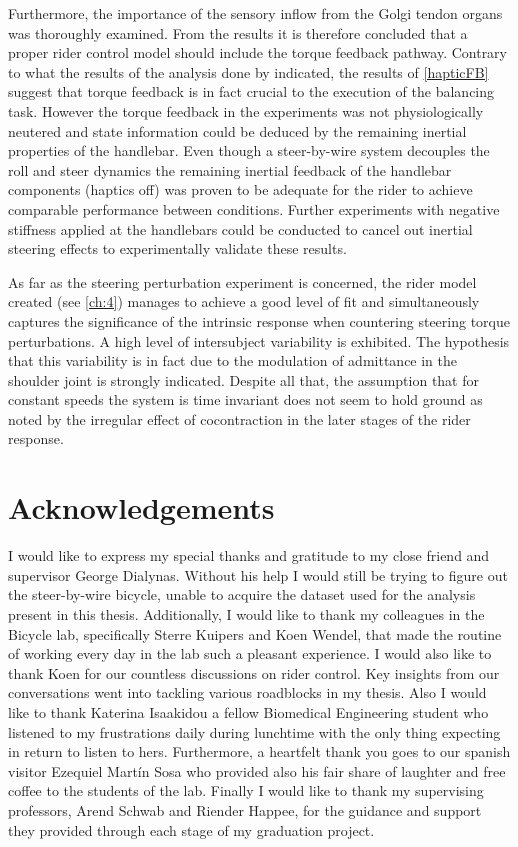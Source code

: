 Furthermore, the importance of the sensory inflow from the Golgi tendon organs was thoroughly examined. From the results it is therefore concluded that a proper rider control model should include the torque feedback pathway. Contrary to what  the results of the analysis done by \citet{dialynaseffect} indicated, the results of \cref{hapticFB} suggest that torque feedback is in fact crucial to the execution of the balancing task. However the torque feedback in the experiments was not physiologically neutered and  state information could be deduced by the remaining inertial properties of the handlebar. Even though a steer-by-wire system decouples the roll and steer dynamics the remaining inertial feedback of the handlebar components (haptics off) was proven to be adequate for the rider to achieve comparable performance between conditions. Further experiments with negative stiffness applied at the handlebars could be conducted to cancel out inertial steering effects to experimentally validate  these results.
 
 
As far as the steering perturbation experiment is concerned, the rider model created (see \cref{ch:4}) manages to achieve a good level of fit and simultaneously captures the significance of the intrinsic response when countering steering torque perturbations. A high level of intersubject variability is exhibited. The hypothesis that this variability is in fact due to the modulation of admittance in the shoulder joint is strongly indicated. Despite all that,  the assumption that for constant speeds the system is time invariant does not seem to hold ground as noted by the irregular effect of cocontraction in the later stages of the rider  response.


\chapter*{Acknowledgements}

I would like to express my special thanks and gratitude to my close friend and supervisor  George Dialynas. Without his help I would still be trying to figure out the steer-by-wire bicycle, unable to acquire the dataset used for the analysis present in this thesis. Additionally, I would like to thank my colleagues in the Bicycle lab, specifically Sterre Kuipers and Koen Wendel, that made the routine of working every day in the lab such a pleasant experience. I would also like to thank Koen  for our countless discussions on rider control. Key insights from our conversations went into tackling various roadblocks in my thesis. Also I would like to thank Katerina Isaakidou a fellow Biomedical Engineering student who listened to my frustrations daily during lunchtime with the only thing expecting in return to listen to hers. Furthermore, a heartfelt thank you goes to our spanish visitor Ezequiel Martín Sosa who provided also his fair share of laughter and free coffee to the students of the lab. Finally I would like to thank my supervising  professors, Arend Schwab and Riender Happee, for the guidance and support they provided through each stage of  my graduation project.